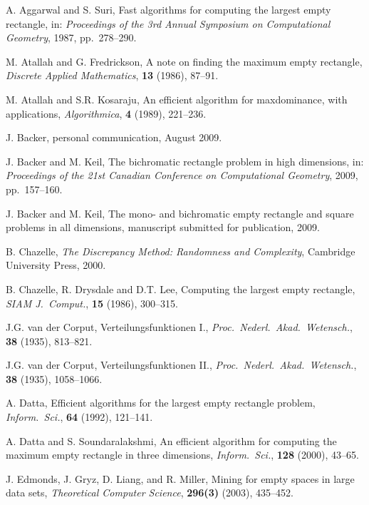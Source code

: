 \documentclass[11pt]{article}
\begin{document}
\begin{thebibliography}{9}
\itemsep 3pt

A. Aggarwal and S. Suri,
Fast algorithms for computing the largest empty rectangle,
in: \emph{Proceedings of the 3rd Annual Symposium on Computational Geometry},
1987, pp.~278--290.

M. Atallah and G. Fredrickson,
A note on finding the maximum empty rectangle, 
\emph{Discrete Applied Mathematics},
\textbf{13} (1986), 87--91.

M. Atallah and S.R. Kosaraju,
An efficient algorithm for maxdominance, with applications,
\emph{Algorithmica},
\textbf{4} (1989), 221--236.

J. Backer, personal communication, August 2009.

J. Backer and M. Keil,
The bichromatic rectangle problem in high dimensions,
in: \emph{Proceedings of the 21st Canadian Conference on Computational Geometry},
2009, pp.~157--160.

J. Backer and M. Keil,
The mono- and bichromatic empty rectangle and square problems in all dimensions,
manuscript submitted for publication, 2009.

B. Chazelle,
\emph{The Discrepancy Method: Randomness and Complexity},
Cambridge University Press, 2000.

B. Chazelle, R. Drysdale and D.T. Lee,
Computing the largest empty rectangle, 
\emph{SIAM J.\ Comput.}, 
\textbf{15} (1986), 300--315.

J.G. van der Corput,
Verteilungsfunktionen I.,
\emph{Proc.\ Nederl.\ Akad.\ Wetensch.}, 
\textbf{38} (1935), 813--821.

J.G. van der Corput,
Verteilungsfunktionen II.,
\emph{Proc.\ Nederl.\ Akad.\ Wetensch.}, 
\textbf{38} (1935), 1058--1066.

A. Datta,
Efficient algorithms for the largest empty rectangle problem, 
\emph{Inform.\ Sci.},
\textbf{64} (1992), 121--141.

A. Datta and S. Soundaralakshmi,
An efficient algorithm for computing the
maximum empty rectangle in three dimensions,
\emph{Inform.\ Sci.},
\textbf{128} (2000), 43--65.

J. Edmonds, J. Gryz, D. Liang, and R. Miller,
Mining for empty spaces in large data sets,
\emph{Theoretical Computer Science}, 
\textbf{296(3)} (2003), 435--452.


\end{thebibliography}
\end{document}
